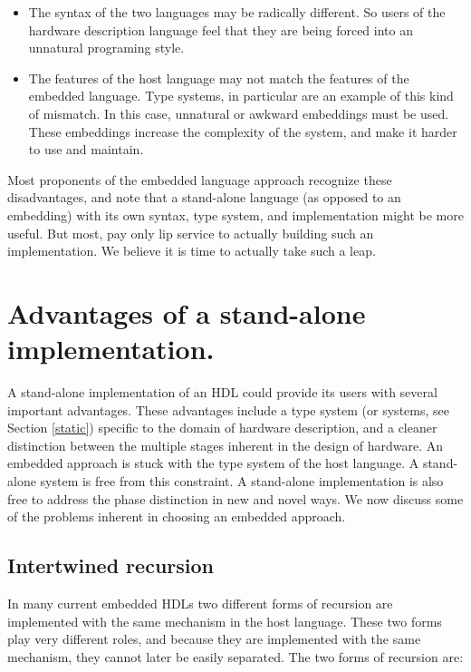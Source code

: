\documentclass[10pt,twoside]{article}
\begin{document}
\begin{itemize}

\item The syntax of the two languages may be radically different. So users of
the hardware description language feel that they are being forced into an
unnatural programing style.

\item The features of the host language may not match the features of the
embedded language. Type systems, in particular are an example of this kind of
mismatch. In this case, unnatural or awkward embeddings must be used. These
embeddings increase the complexity of the system, and make it
harder to use and maintain.

\end{itemize}

Most proponents of the embedded language approach recognize these
disadvantages, and note that a stand-alone language (as opposed to an
embedding) with its own syntax, type system, and implementation might be
more useful. But most, pay only lip service to actually building such
an implementation. We believe it is time to actually take such a leap.

\section{Advantages of a stand-alone implementation.}

A stand-alone implementation of an HDL could provide its users with
several important advantages. These advantages include a type system
(or systems, see Section \ref{static}) specific to the domain of
hardware description, and a cleaner distinction between the multiple
stages inherent in the design of hardware. An embedded approach is
stuck with the type system of the host language. A stand-alone system
is free from this constraint. A stand-alone implementation is also
free to address the phase distinction in new and novel ways. We now
discuss some of the problems inherent in choosing an embedded
approach.

\subsection{Intertwined recursion}

In many current embedded HDLs two different forms of recursion are
implemented with the same mechanism in the host language. These two
forms play very different roles, and because they are implemented
with the same mechanism, they cannot later be easily separated. The
two forms of recursion are:
\end{document}
